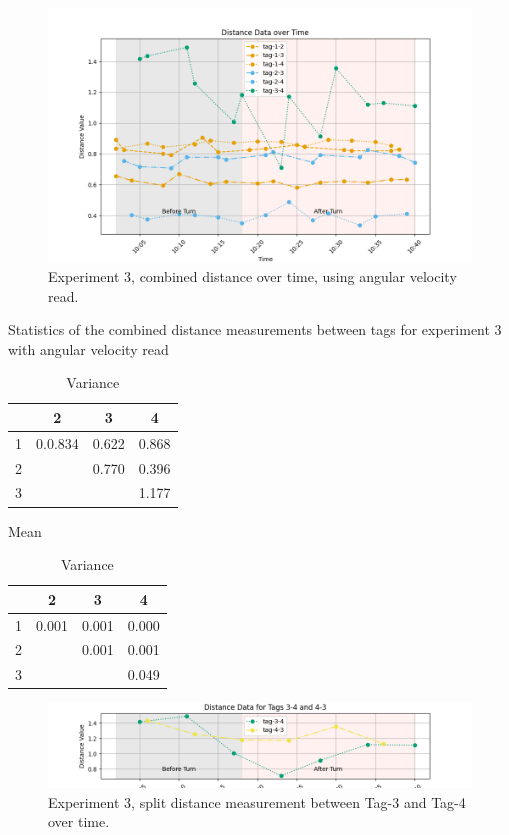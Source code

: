 \begin{figure}[ht!]
	\includegraphics[width=\linewidth]{graphics/exp/exp4_2_dist_combined_2.png}
	\caption{Experiment 3, combined distance over time, using angular velocity read.}
	\label{f:exp4_graphs_dist_comb_2}
\end{figure}

\begin{table}[ht]
\centering
\caption{Statistics of the combined distance measurements between tags for experiment 3 with angular velocity read}
\begin{minipage}{0.45\textwidth}
\centering
\begin{tabular}{|c|c c c|}
\hline
  & 2 & 3 & 4 \\
\hline
1    & 0.0.834 & 0.622 & 0.868 \\
2   &  & 0.770 & 0.396 \\
3   &  &  & 1.177 \\
\hline
\end{tabular}
\caption*{Mean}
\end{minipage}
\hfill
\begin{minipage}{0.45\textwidth}
\centering
\begin{tabular}{|c|c c c|}
\hline
  & 2 & 3 & 4 \\
\hline
1    & 0.001 & 0.001 & 0.000 \\
2   &  & 0.001 & 0.001 \\
3   &  &  & 0.049 \\
\hline
\end{tabular}
\caption*{Variance}
\end{minipage}
\label{tab:exp4_var_distanc}
\end{table}

\begin{figure}[ht!]
	\includegraphics[width=\linewidth]{graphics/exp/exp4_2_gyro_split_distance_3_4.png}
	\caption{Experiment 3, split distance measurement between Tag-3 and Tag-4 over time.}
	\label{f:exp4_graphs_dist_split_3_4}
\end{figure}

